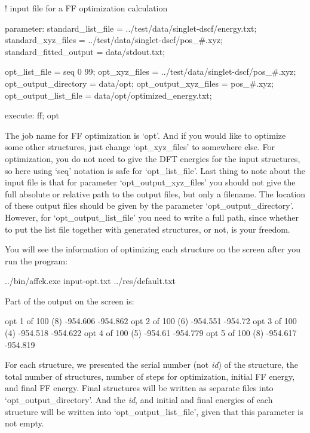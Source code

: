 \documentclass[11pt]{book}
\begin{document}
\begin{everbatim}

! input file for a FF optimization calculation

{ parameter: 
   standard_list_file     = ../test/data/singlet-dscf/energy.txt;
   standard_xyz_files     = ../test/data/singlet-dscf/pos_#.xyz;
   standard_fitted_output = data/stdout.txt;
   
   opt_list_file          = seq 0 99;
   opt_xyz_files          = ../test/data/singlet-dscf/pos_#.xyz;
   opt_output_directory   = data/opt;
   opt_output_xyz_files   = pos_#.xyz;
   opt_output_list_file   = data/opt/optimized_energy.txt;

}
{ execute: ff; opt }

\end{everbatim}

The job name for FF optimization is `opt'. And if you would like to optimize some other structures, 
just change `opt\_xyz\_files' to somewhere else. For optimization, you do not need to give the DFT 
energies for the input structures, so here using `seq' notation is safe for `opt\_list\_file'. 
Last thing to note about the input file is that for parameter `opt\_output\_xyz\_files' you should not 
give the full absolute or relative path to the output files, but only a filename. The location of these 
output files should be given by the parameter `opt\_output\_directory'. However, for `opt\_output\_list\_file' 
you need to write a full path, since whether to put the list file together with generated structures, or not, 
is your freedom.

You will see the information of optimizing each structure on the screen after you run the program:

\begin{everbatim}
../bin/affck.exe input-opt.txt ../res/default.txt
\end{everbatim}

Part of the output on the screen is:

\begin{everbatim}
opt 1 of 100 (8) -954.606 -954.862
opt 2 of 100 (6) -954.551 -954.72
opt 3 of 100 (4) -954.518 -954.622
opt 4 of 100 (5) -954.61 -954.779
opt 5 of 100 (8) -954.617 -954.819
\end{everbatim}

For each structure, we presented the serial number (not \emph{id}) of the structure, the total number of 
structures, number of steps for optimization, initial FF energy, and final FF energy. Final structures will 
be written as separate files into `opt\_output\_directory'. And the \emph{id}, and initial and final energies 
of each structure will be written into `opt\_output\_list\_file', given that this parameter is not empty.
\end{document}
